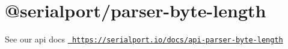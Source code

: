 \chapter{@serialport/parser-\/byte-\/length}
\hypertarget{md_Dashboard_2node__modules_2_0dserialport_2parser-byte-length_2README}{}\label{md_Dashboard_2node__modules_2_0dserialport_2parser-byte-length_2README}
\label{md_Dashboard_2node__modules_2_0dserialport_2parser-byte-length_2README_autotoc_md83}%
%
 See our api docs \href{https://serialport.io/docs/api-parser-byte-length}{\texttt{ https\+://serialport.\+io/docs/api-\/parser-\/byte-\/length}} 